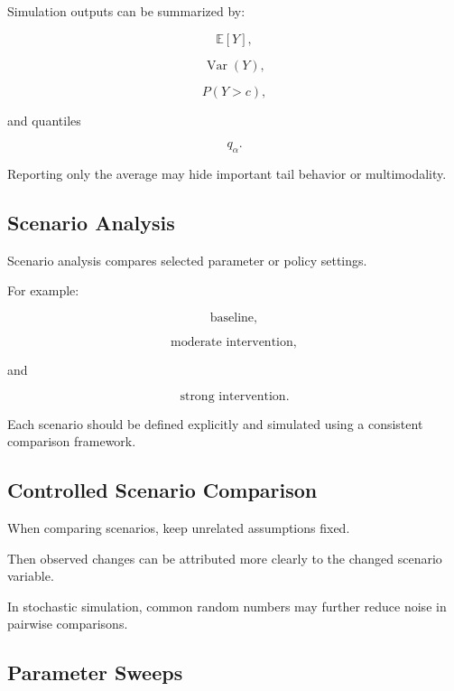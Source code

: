 Simulation outputs can be summarized by:

\[
\boxed{
\mathbb{E}[Y],
}
\]

\[
\boxed{
\operatorname{Var}(Y),
}
\]

\[
\boxed{
P(Y>c),
}
\]

and quantiles

\[
\boxed{
q_\alpha.
}
\]

Reporting only the average may hide important tail behavior or
multimodality.

\subsection{Scenario Analysis}
\label{subsec:simulation-scenario-analysis}

Scenario analysis compares selected parameter or policy settings.

For example:

\[
\boxed{
\text{baseline},
}
\]

\[
\boxed{
\text{moderate intervention},
}
\]

and

\[
\boxed{
\text{strong intervention}.
}
\]

Each scenario should be defined explicitly and simulated using a consistent
comparison framework.

\subsection{Controlled Scenario Comparison}
\label{subsec:controlled-scenario-comparison}

When comparing scenarios, keep unrelated assumptions fixed.

Then observed changes can be attributed more clearly to the changed
scenario variable.

In stochastic simulation, common random numbers may further reduce noise
in pairwise comparisons.

\subsection{Parameter Sweeps}
\label{subsec:simulation-parameter-sweeps}

